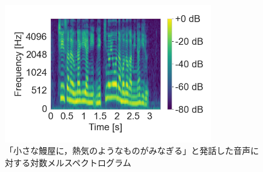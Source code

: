\begin{figure}[bt]
    \centering
    \includegraphics[height=60mm]{./figure/sec2/melspectrogram.png}
    \caption{「小さな鰻屋に，熱気のようなものがみなぎる」と発話した音声に対する対数メルスペクトログラム}
    \label{sec2:fig:melspectrogram}
\end{figure}